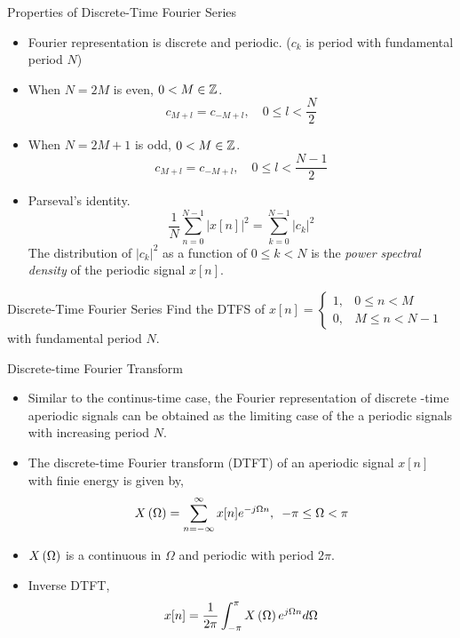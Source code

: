 \documentclass[aspectratio=169]{beamer}
\let\olditem\item
\renewcommand{\item}{\setlength{\itemsep}{\fill}\olditem}
\def\mb{\ensuremath\mathbb}
\def\lp{\ensuremath\left(}
\def\rp{\ensuremath\right)}
\begin{document}
\begin{frame}[t]{Properties of Discrete-Time Fourier Series}
\begin{itemize}
  \item Fourier representation is discrete and periodic. ($c_k$ is period with fundamental period $N$)
  \item When $N = 2M$ is even, $0 < M \in \mb{Z}$.
  \[ c_{M + l} = c_{-M + l}, \quad 0 \leq l < \frac{N}{2} \]
  \item When $N = 2M + 1$ is odd, $0 < M \in \mb{Z}$.
  \[ c_{M + l} = c_{-M + l}, \quad 0 \leq l < \frac{N - 1}{2} \]
  \item Parseval's identity.
  \[ \frac{1}{N}\sum_{n=0}^{N-1} \vert x[n] \vert^2 = \sum_{k=0}^{N-1} \vert c_k \vert^2 \]
  The distribution of $\vert c_k \vert^2$ as a function of $0 \leq k < N$ is the \textit{power spectral density} of the periodic signal $x[n]$.
\end{itemize}
\end{frame}


\begin{frame}[t]{Discrete-Time Fourier Series}
Find the DTFS of  $x[n] = \begin{cases} 1, & 0 \leq n < M \\ 0, & M \leq n < N-1 \end{cases}$ with fundamental period $N$.
\end{frame}


\begin{frame}[t]{Discrete-time Fourier Transform}
\begin{itemize}
  \item Similar to the continus-time case, the Fourier representation of discrete -time aperiodic signals can be obtained as the limiting case of the a periodic signals with increasing period $N$.

  \item The discrete-time Fourier transform (DTFT) of an aperiodic signal $x[n]$ with finie energy is given by,
  \[ X\lp \Omega \rp = \sum_{n = -\infty}^{\infty} x[n] e^{-j \Omega n}, \,\,\, -\pi \leq \Omega < \pi \]

  \item $X\lp \Omega \rp$ is a continuous in $\Omega$ and periodic with period $2\pi$.

  \item Inverse DTFT,
  \[ x[n] = \frac{1}{2\pi} \int_{-\pi}^{\pi} X\lp \Omega \rp e^{j\Omega n} d\Omega \]
\end{itemize}  
\end{frame}
\end{document}
